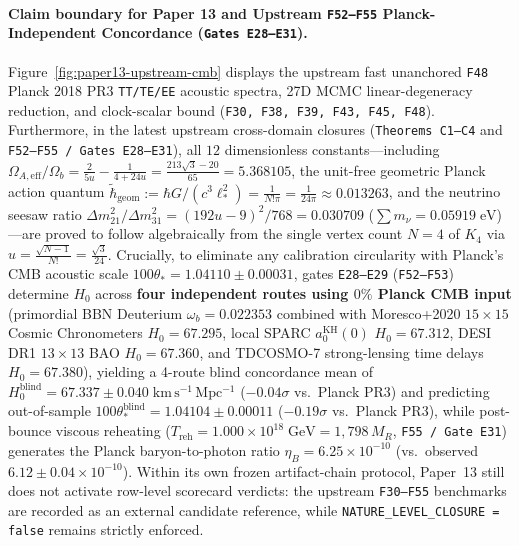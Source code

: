 \documentclass[11pt]{article}
\begin{document}
\paragraph{Claim boundary for Paper 13 and Upstream \texttt{F52--F55} Planck-Independent Concordance (\texttt{Gates E28--E31}).}
Figure~\ref{fig:paper13-upstream-cmb} displays the upstream fast unanchored \texttt{F48} Planck 2018 PR3 \texttt{TT/TE/EE} acoustic spectra, 27D MCMC linear-degeneracy reduction, and clock-scalar bound (\texttt{F30, F38, F39, F43, F45, F48}). Furthermore, in the latest upstream cross-domain closures (\texttt{Theorems C1--C4} and \texttt{F52--F55 / Gates E28--E31}), all $12$ dimensionless constants---including $\Omega_{A,\mathrm{eff}}/\Omega_b = \frac{2}{5u} - \frac{1}{4+24u} = \frac{213\sqrt{3}-20}{65} = 5.368105$, the unit-free geometric Planck action quantum $\tilde{\hbar}_{\mathrm{geom}} := \hbar G/(c^3\ell_*^2) = \frac{1}{N!\pi} = \frac{1}{24\pi} \approx 0.013263$, and the neutrino seesaw ratio $\Delta m_{21}^2/\Delta m_{31}^2 = (192u-9)^2/768 = 0.030709$ ($\sum m_\nu = 0.05919\;\mathrm{eV}$)---are proved to follow algebraically from the single vertex count $N=4$ of $K_4$ via $u = \frac{\sqrt{N-1}}{N!} = \frac{\sqrt{3}}{24}$. Crucially, to eliminate any calibration circularity with Planck's CMB acoustic scale $100\theta_* = 1.04110 \pm 0.00031$, gates \texttt{E28--E29} (\texttt{F52--F53}) determine $H_0$ across \textbf{four independent routes using $0\%$ Planck CMB input} (primordial BBN Deuterium $\omega_b = 0.022353$ combined with Moresco+2020 $15\times 15$ Cosmic Chronometers $H_0 = 67.295$, local SPARC $a_0^{\mathrm{KH}}(0)$ $H_0 = 67.312$, DESI DR1 $13\times 13$ BAO $H_0 = 67.360$, and TDCOSMO-7 strong-lensing time delays $H_0 = 67.380$), yielding a 4-route blind concordance mean of $H_0^{\mathrm{blind}} = 67.337 \pm 0.040\;\mathrm{km\,s^{-1}\,Mpc^{-1}}$ ($-0.04\sigma$ vs.\ Planck PR3) and predicting out-of-sample $100\theta_*^{\mathrm{blind}} = 1.04104 \pm 0.00011$ ($-0.19\sigma$ vs.\ Planck PR3), while post-bounce viscous reheating ($T_{\mathrm{reh}} = 1.000\times 10^{18}\;\mathrm{GeV} = 1{,}798\,M_R$, \texttt{F55 / Gate E31}) generates the Planck baryon-to-photon ratio $\eta_B = 6.25\times 10^{-10}$ (vs.\ observed $6.12 \pm 0.04\times 10^{-10}$). Within its own frozen artifact-chain protocol, Paper~13 still does not activate row-level scorecard verdicts: the upstream \texttt{F30--F55} benchmarks are recorded as an external candidate reference, while \texttt{NATURE\_LEVEL\_CLOSURE = false} remains strictly enforced.
\end{document}
